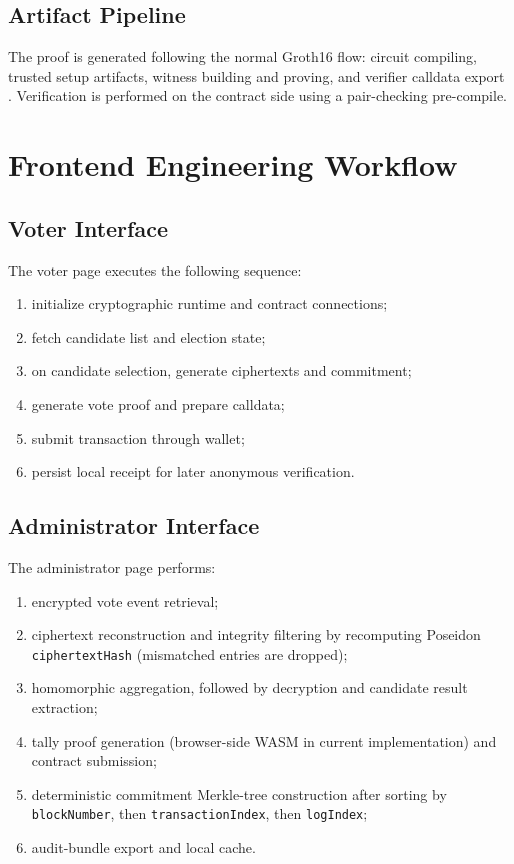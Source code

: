 \subsection{Artifact Pipeline}

The proof is generated following the normal Groth16 flow: circuit compiling, trusted setup artifacts, witness building and proving, and verifier calldata export \cite{circomdocs,snarkjs}. Verification is performed on the contract side using a pair-checking pre-compile.

\section{Frontend Engineering Workflow}

\subsection{Voter Interface}

The voter page executes the following sequence:
\begin{enumerate}
    \item initialize cryptographic runtime and contract connections;
    \item fetch candidate list and election state;
    \item on candidate selection, generate ciphertexts and commitment;
    \item generate vote proof and prepare calldata;
    \item submit transaction through wallet;
    \item persist local receipt for later anonymous verification.
\end{enumerate}

\subsection{Administrator Interface}

The administrator page performs:
\begin{enumerate}
    \item encrypted vote event retrieval;
    \item ciphertext reconstruction and integrity filtering by recomputing Poseidon \texttt{ciphertextHash} (mismatched entries are dropped);
    \item homomorphic aggregation, followed by decryption and candidate result extraction;
    \item tally proof generation (browser-side WASM in current implementation) and contract submission;
    \item deterministic commitment Merkle-tree construction after sorting by \texttt{blockNumber}, then \texttt{transactionIndex}, then \texttt{logIndex};
    \item audit-bundle export and local cache.
\end{enumerate}

